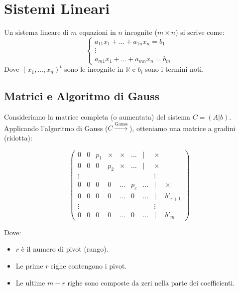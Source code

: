 \section{Sistemi Lineari}

Un sistema lineare di $m$ equazioni in $n$ incognite ($m \times n$) si scrive come:
\[
\begin{cases}
a_{11}x_1 + \dots + a_{1n}x_n = b_1 \\
\vdots \\
a_{m1}x_1 + \dots + a_{mn}x_n = b_m
\end{cases}
\]
Dove $(x_1, \dots, x_n)^t$ sono le incognite in $\mathbb{R}$ e $b_i$ sono i termini noti.

\subsection{Matrici e Algoritmo di Gauss}

Consideriamo la matrice completa (o aumentata) del sistema $C = (A|b)$.
Applicando l'algoritmo di Gauss ($C \xrightarrow{\text{Gauss}}$), otteniamo una matrice a gradini (ridotta):

\[
\begin{pmatrix}
0 & 0 & p_1 & \times & \times & \dots & | & \times \\
0 & 0 & 0 & p_2 & \times & \dots & | & \times \\
\vdots & & & & & & & \vdots \\
0 & 0 & 0 & 0 & \dots & p_r & \dots & | & \times \\
0 & 0 & 0 & 0 & \dots & 0 & \dots & | & b'_{r+1} \\
\vdots & & & & & & & \vdots \\
0 & 0 & 0 & 0 & \dots & 0 & \dots & | & b'_m
\end{pmatrix}
\]

Dove:
\begin{itemize}
    \item $r$ è il numero di pivot (rango).
    \item Le prime $r$ righe contengono i pivot.
    \item Le ultime $m-r$ righe sono composte da zeri nella parte dei coefficienti.
\end{itemize}

